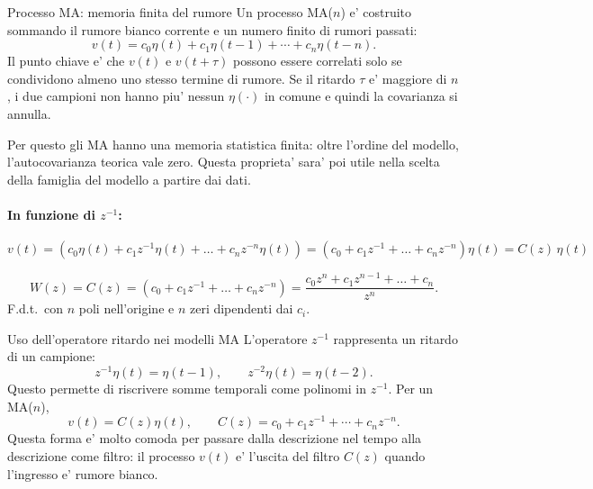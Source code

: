 \documentclass[11pt,a4paper]{article}
\begin{document}
\begin{spiegazione}{Processo MA: memoria finita del rumore}
Un processo MA($n$) e' costruito sommando il rumore bianco corrente e un numero finito di rumori passati:
\[
v(t)=c_0\eta(t)+c_1\eta(t-1)+\cdots+c_n\eta(t-n).
\]
Il punto chiave e' che $v(t)$ e $v(t+\tau)$ possono essere correlati solo se condividono almeno uno stesso termine di rumore. Se il ritardo $\tau$ e' maggiore di $n$, i due campioni non hanno piu' nessun $\eta(\cdot)$ in comune e quindi la covarianza si annulla.

Per questo gli MA hanno una memoria statistica finita: oltre l'ordine del modello, l'autocovarianza teorica vale zero. Questa proprieta' sara' poi utile nella scelta della famiglia del modello a partire dai dati.
\end{spiegazione}

\paragraph{In funzione di $z^{-1}$:}
\[
v(t)=(c_0\eta(t)+c_1 z^{-1}\eta(t)+\dots+c_n z^{-n}\eta(t)) = (c_0+c_1 z^{-1}+\dots+c_n z^{-n})\eta(t)=C(z)\,\eta(t)
\]

\[
W(z)=C(z)= (c_0+c_1 z^{-1}+\dots+c_n z^{-n}) =  \frac{c_0 z^n+c_1 z^{n-1}+\dots+c_n}{z^n}.
\]
F.d.t.\ con $n$ poli nell'origine e $n$ zeri dipendenti dai $c_i$.

\begin{center}
\end{center}

\begin{spiegazione}{Uso dell'operatore ritardo nei modelli MA}
L'operatore $z^{-1}$ rappresenta un ritardo di un campione:
\[
z^{-1}\eta(t)=\eta(t-1),\qquad z^{-2}\eta(t)=\eta(t-2).
\]
Questo permette di riscrivere somme temporali come polinomi in $z^{-1}$. Per un MA($n$),
\[
v(t)=C(z)\eta(t),
\qquad
C(z)=c_0+c_1z^{-1}+\cdots+c_nz^{-n}.
\]
Questa forma e' molto comoda per passare dalla descrizione nel tempo alla descrizione come filtro: il processo $v(t)$ e' l'uscita del filtro $C(z)$ quando l'ingresso e' rumore bianco.
\end{spiegazione}
\end{document}
